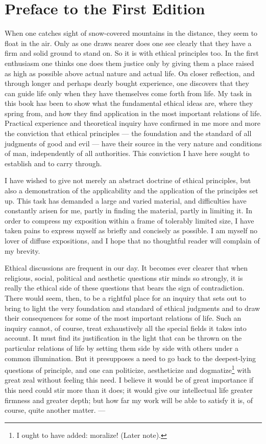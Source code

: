 \documentclass[12pt,a4paper,openany]{book}
\begin{document}
\chapter*{Preface to the First Edition}
When one catches sight of snow-covered mountains in the distance, they seem to float in the air.
Only as one draws nearer does one see clearly that they have a firm and solid ground to stand on.
So it is with ethical principles too. In the first enthusiasm one thinks one does them justice only
by giving them a place raised as high as possible above actual nature and actual life. On closer
reflection, and through longer and perhaps dearly bought experience, one discovers that they can
guide life only when they have themselves come forth from life. My task in this book has been to
show what the fundamental ethical ideas are, where they spring from, and how they find application
in the most important relations of life. Practical experience and theoretical inquiry have
confirmed in me more and more the conviction that ethical principles --- the foundation and the
standard of all judgments of good and evil --- have their source in the very nature and conditions
of man, independently of all authorities. This conviction I have here sought to establish and to
carry through.

I have wished to give not merely an abstract doctrine of ethical principles, but also a
demonstration of the applicability and the application of the principles set up. This task has
demanded a large and varied material, and difficulties have constantly arisen for me, partly in
finding the material, partly in limiting it. In order to compress my exposition within a frame of
tolerably limited size, I have taken pains to express myself as briefly and concisely as possible.
I am myself no lover of diffuse expositions, and I hope that no thoughtful reader will complain of
my brevity.

Ethical discussions are frequent in our day. It becomes ever clearer that when religious, social,
political and aesthetic questions stir minds so strongly, it is really the ethical side of these
questions that bears the sign of contradiction. There would seem, then, to be a rightful place for
an inquiry that sets out to bring to light the very foundation and standard of ethical judgments
and to draw their consequences for some of the most important relations of life. Such an inquiry
cannot, of course, treat exhaustively all the special fields it takes into account. It must find
its justification in the light that can be thrown on the particular relations of life by setting
them side by side with others under a common illumination. But it presupposes a need to go back to
the deepest-lying questions of principle, and one can politicize, aestheticize and
dogmatize\footnote[1]{I ought to have added: moralize! (Later note).}
with great zeal without feeling this need. I believe it would be of great importance if this need
could stir more than it does; it would give our intellectual life greater firmness and greater
depth; but how far my work will be able to satisfy it is, of course, quite another matter.
---
\end{document}
